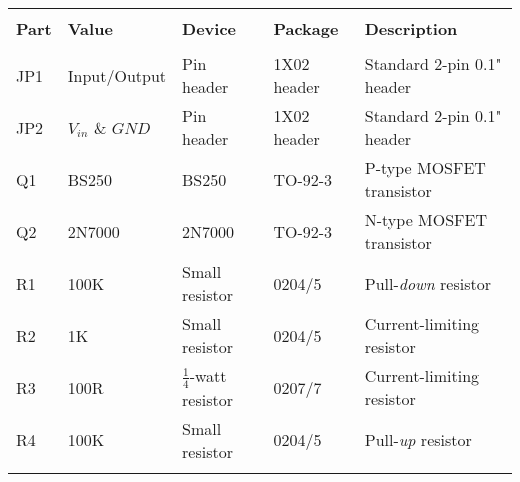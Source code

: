 \begin{tabular}{lllll}
\hline\\[\negsep]
\textbf{Part} & \textbf{Value} & \textbf{Device} & \textbf{Package} & \textbf{Description} \\[\sep]
\hline\\[\negsep]
JP1  &  Input/Output & Pin header    & 1X02 header     & Standard 2-pin 0.1" header \\[\sep]
JP2  &  $V_{in}$ \& $GND$ & Pin header & 1X02 header     & Standard 2-pin 0.1" header \\[\sep]
Q1   &  BS250       &  BS250         & TO-92-3     & P-type MOSFET transistor \\[\sep]
Q2   &  2N7000      & 2N7000         & TO-92-3     & N-type MOSFET transistor \\[\sep]
R1   &  100K        & Small resistor & 0204/5    & Pull-\emph{down} resistor \\[\sep]
R2   &  1K          & Small resistor & 0204/5    & Current-limiting resistor \\[\sep]
R3   &  100R        & $\frac{1}{4}$-watt resistor & 0207/7 & Current-limiting resistor \\[\sep]
R4   &  100K        & Small resistor & 0204/5    & Pull-\emph{up} resistor \\[\sep]
\hline\\
\end{tabular}
